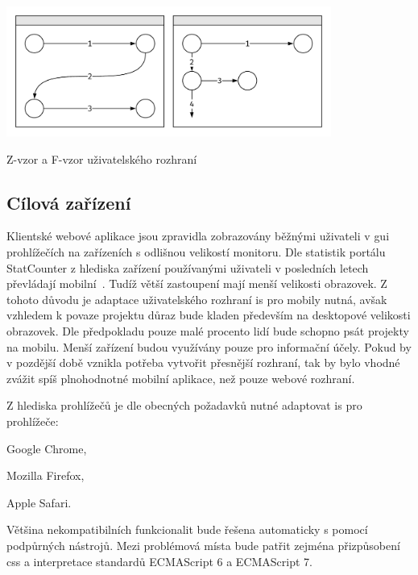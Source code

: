 \begin{fig:illustration}
   \includegraphics[width=0.8\textwidth]{images/dia-design-patterns.pdf}
   \caption{Z-vzor a F-vzor uživatelského rozhraní}\label{pic:dia-design-patterns}
\end{fig:illustration}




\subsection{Cílová zařízení}

Klientské webové aplikace jsou zpravidla zobrazovány běžnými uživateli v \gls{gui} prohlížečích na zařízeních s odlišnou velikostí monitoru. Dle statistik portálu StatCounter z hlediska zařízení používanými uživateli v posledních letech převládají mobilní~\cite{statCounterDevices}. Tudíž větší zastoupení mají menší velikosti obrazovek. Z tohoto důvodu je adaptace uživatelského rozhraní \gls{is} pro mobily nutná, avšak vzhledem k povaze projektu důraz bude kladen především na desktopové velikosti obrazovek. Dle předpokladu pouze malé procento lidí bude schopno psát projekty na mobilu. Menší zařízení budou využívány pouze pro informační účely. Pokud by v pozdější době vznikla potřeba vytvořit přesnější rozhraní, tak by bylo vhodné zvážit spíš plnohodnotné mobilní aplikace, než pouze webové rozhraní.

Z hlediska prohlížečů je dle obecných požadavků nutné adaptovat \gls{is} pro prohlížeče:
\begin{ulnar}
   \item Google Chrome,
   \item Mozilla Firefox,
   \item Apple Safari.
\end{ulnar}

Většina nekompatibilních funkcionalit bude řešena automaticky s pomocí podpůrných nástrojů. Mezi problémová místa bude patřit zejména přizpůsobení \gls{css} a interpretace standardů ECMAScript 6 a ECMAScript 7.


